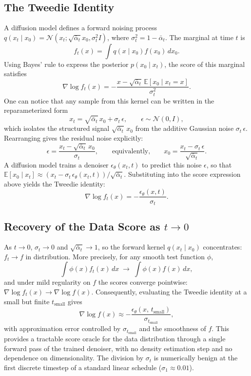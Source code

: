 \documentclass{article}
\newcommand{\E}{\mathbb{E}}
\begin{document}
\subsection{The Tweedie Identity}
A diffusion model defines a forward noising process $q(x_t \mid x_0) = \mathcal{N}(x_t;
\sqrt{\bar\alpha_t} x_0, \sigma_t^2 I)$, where $\sigma_t^2 = 1 - \bar\alpha_t$.
The marginal at time $t$ is
\[
f_t(x) = \int q(x \mid x_0) f(x_0)\, dx_0.
\]
Using Bayes' rule to express the posterior $p(x_0 \mid x_t)$, the score of this marginal satisfies
\[
\nabla \log f_t(x) = -\frac{x - \sqrt{\bar\alpha_t}\,\E[x_0 \mid x_t = x]}{\sigma_t^2}.
\]
One can notice that any sample from this kernel can be written in the reparameterized form
\[
x_t = \sqrt{\bar\alpha_t}\,x_0 + \sigma_t\,\epsilon, \qquad \epsilon \sim \mathcal{N}(0, I),
\]
which isolates the structured signal $\sqrt{\bar\alpha_t}\,x_0$ from the additive
Gaussian noise $\sigma_t\,\epsilon$. Rearranging gives the residual noise explicitly:
\[
\epsilon = \frac{x_t - \sqrt{\bar\alpha_t}\,x_0}{\sigma_t},
\qquad \text{equivalently,} \qquad
x_0 = \frac{x_t - \sigma_t\,\epsilon}{\sqrt{\bar\alpha_t}}.
\]
A diffusion model trains a denoiser $\epsilon_\theta(x_t, t)$ to predict this noise $\epsilon$,
so that $\E[x_0 \mid x_t] \approx (x_t - \sigma_t\,\epsilon_\theta(x_t, t))/\sqrt{\bar\alpha_t}$.
Substituting into the score expression above yields the Tweedie identity:
\[
\nabla \log f_t(x) = -\frac{\epsilon_\theta(x, t)}{\sigma_t}.
\]


\subsection{Recovery of the Data Score as $t \to 0$}
As $t \to 0$, $\sigma_t \to 0$ and $\sqrt{\bar\alpha_t} \to 1$, so the forward kernel
$q(x_t \mid x_0)$ concentrates: $f_t \to f$ in distribution. More precisely, for any
smooth test function $\phi$,
\[
\int \phi(x) f_t(x)\, dx \;\to\; \int \phi(x) f(x)\, dx,
\]
and under mild regularity on $f$ the scores converge pointwise:
$\nabla \log f_t(x) \to \nabla \log f(x)$.
Consequently, evaluating the Tweedie identity at a small but finite $t_{\mathrm{small}}$
gives
\[
\nabla \log f(x) \approx -\frac{\epsilon_\theta(x,\, t_{\mathrm{small}})}{\sigma_{t_{\mathrm{small}}}},
\]
with approximation error controlled by $\sigma_{t_{\mathrm{small}}}$ and the smoothness
of $f$. This provides a tractable score oracle for the data distribution through a
single forward pass of the trained denoiser, with no density estimation step and no
dependence on dimensionality. The division by $\sigma_t$ is numerically benign at the
first discrete timestep of a standard linear schedule ($\sigma_1 \approx 0.01$).
\end{document}

